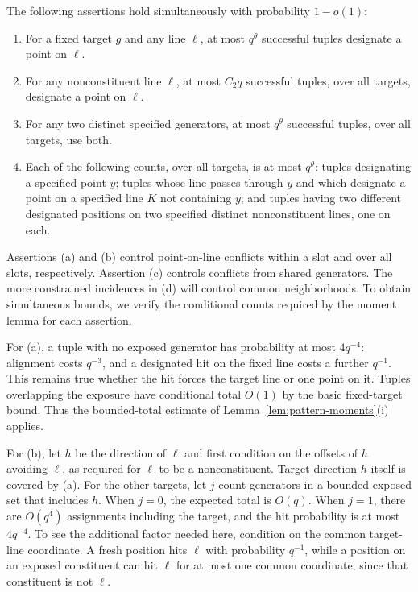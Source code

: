 The following assertions hold simultaneously with probability $1-o(1)$:
\begin{enumerate}[label=\textup{(\alph*)}]
\item For a fixed target $g$ and any line $\ell$, at most $q^\theta$
successful tuples designate a point on $\ell$.
\item For any nonconstituent line $\ell$, at most $C_2q$ successful
tuples, over all targets, designate a point on $\ell$.
\item For any two distinct specified generators, at most $q^\theta$
successful tuples, over all targets, use both.
\item Each of the following counts, over all targets, is at most
$q^\theta$: tuples designating a specified point $y$; tuples whose line
passes through $y$ and which designate a point on a specified line $K$
not containing $y$; and tuples having two different designated positions
on two specified distinct nonconstituent lines, one on each.
\end{enumerate}
Assertions (a) and (b) control point-on-line conflicts within a slot and
over all slots, respectively. Assertion (c) controls conflicts from
shared generators. The more constrained incidences in (d) will control
common neighborhoods. To obtain simultaneous bounds, we verify the
conditional counts required by the moment lemma for each assertion.

For (a), a tuple with no exposed generator has probability at most
$4q^{-4}$: alignment costs $q^{-3}$, and a designated hit on the fixed
line costs a further $q^{-1}$. This remains true whether the hit forces
the target line or one point on it. Tuples overlapping the exposure have
conditional total $O(1)$ by the basic fixed-target bound. Thus the
bounded-total estimate of Lemma~\ref{lem:pattern-moments}(i) applies.

For (b), let $h$ be the direction of $\ell$ and first condition on the
offsets of $h$ avoiding $\ell$, as required for $\ell$ to be a
nonconstituent. Target direction $h$ itself is covered by (a). For the
other targets, let $j$ count generators in a bounded exposed set that
includes $h$. When $j=0$, the expected total is $O(q)$. When $j=1$,
there are $O(q^4)$ assignments including the target, and the hit
probability is at most $4q^{-4}$. To see the additional factor needed
here, condition on the common target-line coordinate. A fresh position
hits $\ell$ with probability $q^{-1}$, while a position on an exposed
constituent can hit $\ell$ for at most one common coordinate, since
that constituent is not $\ell$.

